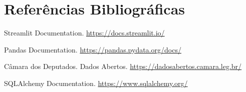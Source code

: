 \documentclass[12pt,a4paper]{article}
\begin{document}
\section{Referências Bibliográficas}
\begin{thebibliography}{9}
Streamlit Documentation.
\url{https://docs.streamlit.io/}

Pandas Documentation.
\url{https://pandas.pydata.org/docs/}

Câmara dos Deputados. Dados Abertos.
\url{https://dadosabertos.camara.leg.br/}

SQLAlchemy Documentation.
\url{https://www.sqlalchemy.org/}

\end{thebibliography}
\end{document}
